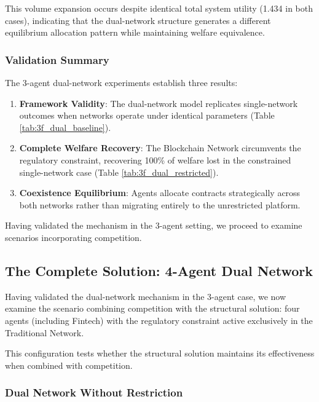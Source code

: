 This volume expansion occurs despite identical total system utility (1.434 in both cases), indicating that the dual-network structure generates a different equilibrium allocation pattern while maintaining welfare equivalence.

\subsubsection{Validation Summary}

The 3-agent dual-network experiments establish three results:

\begin{enumerate}
    \item \textbf{Framework Validity}: The dual-network model replicates single-network outcomes when networks operate under identical parameters (Table \ref{tab:3f_dual_baseline}).
    
    \item \textbf{Complete Welfare Recovery}: The Blockchain Network circumvents the regulatory constraint, recovering 100\% of welfare lost in the constrained single-network case (Table \ref{tab:3f_dual_restricted}).
    
    \item \textbf{Coexistence Equilibrium}: Agents allocate contracts strategically across both networks rather than migrating entirely to the unrestricted platform.
\end{enumerate}

Having validated the mechanism in the 3-agent setting, we proceed to examine scenarios incorporating competition.

\subsection{The Complete Solution: 4-Agent Dual Network}
\label{sec:dual_4agents}

Having validated the dual-network mechanism in the 3-agent case, we now examine the scenario combining competition with the structural solution: four agents (including Fintech) with the regulatory constraint active exclusively in the Traditional Network.

This configuration tests whether the structural solution maintains its effectiveness when combined with competition.

\subsubsection{Dual Network Without Restriction}

